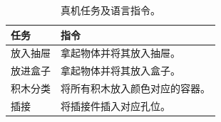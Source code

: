\begin{table}[H]
\centering
\caption{真机任务及语言指令。}
\label{tab:task-instructions}
\small
\setlength{\tabcolsep}{4pt}
\renewcommand{\arraystretch}{1.2}
\begin{tabularx}{\linewidth}{@{}lY@{}}
\toprule
任务 & 指令 \\
\midrule
放入抽屉 & 拿起物体并将其放入抽屉。 \\
放进盒子 & 拿起物体并将其放入盒子。 \\
积木分类 & 将所有积木放入颜色对应的容器。 \\
插接 & 将插接件插入对应孔位。 \\
\bottomrule
\end{tabularx}
\end{table}
